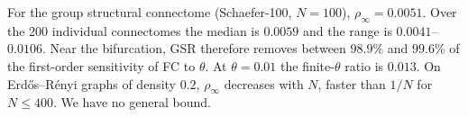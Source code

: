 \begin{remark}\label{rem:rho}
For the group structural connectome (Schaefer-100, $N=100$), $\rho_\infty=0.0051$. Over the 200
individual connectomes the median is $0.0059$ and the range is $0.0041$--$0.0106$. Near the bifurcation,
GSR therefore removes between $98.9\%$ and $99.6\%$ of the first-order sensitivity of FC to $\theta$. At $\theta=0.01$ the finite-$\theta$ ratio
is $0.013$. On Erd\H{o}s--R\'enyi graphs of density $0.2$, $\rho_\infty$ decreases with $N$, faster than
$1/N$ for $N\le400$. We have no general bound.
\end{remark}
